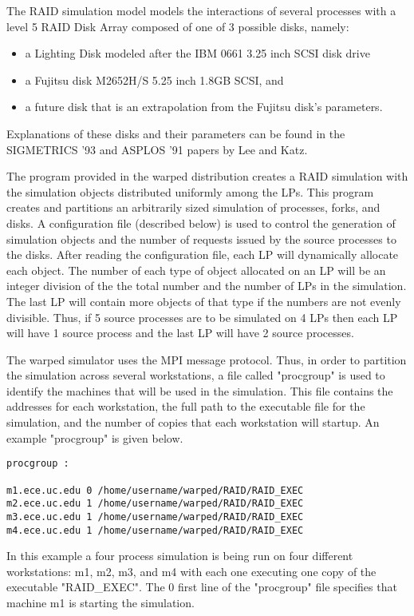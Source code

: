 \documentclass[11pt]{report}
\begin{document}
The RAID simulation model models the interactions of several processes
with a level 5 RAID Disk Array composed of one of 3 possible disks,
namely:
\begin{itemize}
\item
a Lighting Disk modeled after the IBM 0661 3.25 inch SCSI disk drive
\item
a Fujitsu disk M2652H/S 5.25 inch 1.8GB SCSI, and
\item
a future disk that is an extrapolation from the Fujitsu disk's
parameters. 
\end{itemize}
Explanations of these disks and their parameters can be found in the
SIGMETRICS '93 and ASPLOS '91 papers by Lee and Katz.

The program provided in the {\sc warped} distribution creates a RAID
simulation with the simulation objects distributed uniformly among the
LPs. This program creates and partitions an arbitrarily sized simulation
of processes, forks, and disks. A configuration file (described below)
is used to control the generation of simulation objects and the number
of requests issued by the source processes to the disks. After reading
the configuration file, each LP will dynamically allocate each
object. The number of each type of object allocated on an LP will be an
integer division of the the total number and the number of LPs in the
simulation. The last LP will contain more objects of that type if the
numbers are not evenly divisible. Thus, if 5 source processes are to be
simulated on 4 LPs then each LP will have 1 source process and the last
LP will have 2 source processes.

The {\sc warped} simulator uses the MPI message protocol.  Thus, in order
to partition the simulation across several workstations, a file called
"procgroup" is used to identify the machines that will be used in the
simulation.  This file contains the addresses for each workstation, the
full path to the executable file for the simulation, and the number of
copies that each workstation will startup.  An example "procgroup" is
given below.

\begin{verbatim}
procgroup :

m1.ece.uc.edu 0 /home/username/warped/RAID/RAID_EXEC
m2.ece.uc.edu 1 /home/username/warped/RAID/RAID_EXEC
m3.ece.uc.edu 1 /home/username/warped/RAID/RAID_EXEC
m4.ece.uc.edu 1 /home/username/warped/RAID/RAID_EXEC
\end{verbatim}

In this example a four process simulation is being run on four different
workstations: m1, m2, m3, and m4 with each one executing one copy of the
executable "RAID\_EXEC".  The 0 first line of the "procgroup" file
specifies that machine m1 is starting the simulation.
\end{document}
